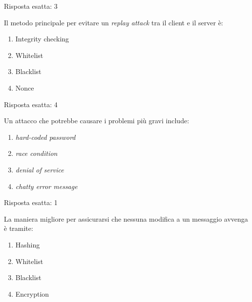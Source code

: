 \begin{Answer} [
  ref={esControlli7},
  number={7}
  ]

  \Question Risposta esatta: 3
\end{Answer}


\begin{Exercise} [
  title={Quiz},
  label={esControlli8}
  ]

  \Question Il metodo principale per evitare un \textit{replay attack} tra il
client e il server è:
\begin{enumerate}
\item Integrity checking
\item Whitelist
\item Blacklist
\item Nonce
\end{enumerate}

\end{Exercise}

\begin{Answer} [
  ref={esControlli8},
  number={8}
  ]

  \Question Risposta esatta: 4
\end{Answer}


\begin{Exercise} [
  title={Quiz},
  label={esControlli9}
  ]

  \Question Un attacco che potrebbe causare i problemi più gravi include:
  \begin{enumerate}
    \item \textit{hard-coded password}
    \item \textit{race condition}
    \item \textit{denial of service}
    \item \textit{chatty error message}
  \end{enumerate}

\end{Exercise}

\begin{Answer} [
  ref={esControlli9},
  number={9}
  ]

  \Question Risposta esatta: 1
\end{Answer}


\begin{Exercise} [
  title={Quiz},
  label={esControlli10}
  ]

  \Question La maniera migliore per assicurarsi che nessuna modifica a un
messaggio avvenga è tramite:
\begin{enumerate}
  \item Hashing
  \item Whitelist
  \item Blacklist
  \item Encryption
\end{enumerate}

\end{Exercise}

